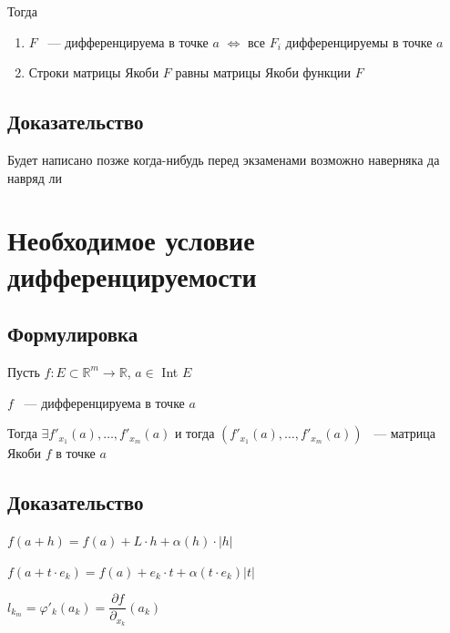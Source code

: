 \documentclass{article}
\begin{document}
            Тогда 
            
                \begin{enumerate}
                
                    \item $F$ ~--- дифференцируема в точке $a$ $\Leftrightarrow$ все $F_i$ дифференцируемы в точке $a$
                    
                    \item Строки матрицы Якоби $F$ равны матрицы Якоби функции $F$
                
                \end{enumerate}
            
        \subsection{Доказательство}
        
            Будет написано позже когда-нибудь перед экзаменами возможно наверняка да навряд ли

    \newpage
    
    \section{Необходимое условие дифференцируемости}
    
        \subsection{Формулировка}
        
            Пусть $f : E \subset \mathbb{R}^m \rightarrow \mathbb{R}$, $a \in$ Int $E$
            
            $f$ ~--- дифференцируема в точке $a$
            
            Тогда $\exists f'_{x_1}(a), \ldots, f'_{x_m}(a)$ и тогда $(f'_{x_1}(a), \ldots, f'_{x_m}(a))$ ~--- матрица Якоби $f$ в точке $a$
            
        \subsection{Доказательство}
        
            $f(a + h) = f(a) + L \cdot h + \alpha(h) \cdot |h|$
            
            $f(a + t \cdot e_k) = f(a) + e_k \cdot t + \alpha(t \cdot e_k) |t|$
            
            $l_{k_m} = \varphi'_k (a_k) = \dfrac{\partial f}{\partial_{x_k}} (a_k)$
            
\end{document}
